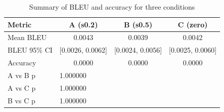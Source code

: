 \begin{table}[ht]
\centering
\begin{tabular}{lccc}
\toprule
Metric & A (s0.2) & B (s0.5) & C (zero)\\
\midrule
Mean BLEU & 0.0043 & 0.0039 & 0.0042\\
BLEU 95\% CI & [0.0026, 0.0062] & [0.0024, 0.0056] & [0.0025, 0.0060]\\
Accuracy & 0.0000 & 0.0000 & 0.0000\\
\midrule
A vs B p & \multicolumn{3}{l}{1.000000}\\
A vs C p & \multicolumn{3}{l}{1.000000}\\
B vs C p & \multicolumn{3}{l}{1.000000}\\
\bottomrule
\end{tabular}
\caption{Summary of BLEU and accuracy for three conditions}
\label{tab:summary}
\end{table}
